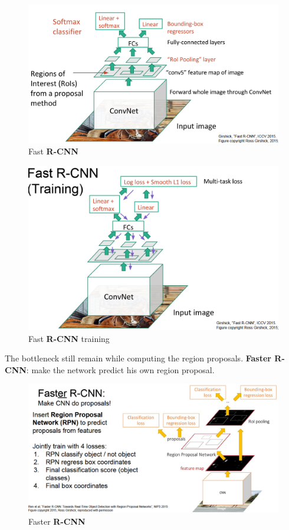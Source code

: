 \documentclass[11pt]{article}
\begin{document}
\begin{minipage}{0.5\textwidth}
\begin{figure} [H]
\centering 
\includegraphics[scale=0.5]{L1015.pdf}
\caption{ Fast \textbf{R-CNN}}
\label{fig:L1015}
\end{figure}
\end{minipage}
\begin{minipage}{0.5\textwidth}
\begin{figure} [H]
\centering 
\includegraphics[scale=0.5]{L1016.pdf}
\caption{ Fast \textbf{R-CNN } training}
\label{fig:L1016}
\end{figure}
\end{minipage}
The bottleneck still remain while computing the region proposals.
\textbf{Faster R-CNN}: make the network predict his own region proposal.
\begin{figure}[h]
\centering
\captionsetup{justification=centering}
\includegraphics[width=0.9\linewidth]{L1017.pdf}
\caption{ Faster \textbf{R-CNN } }
\label{fig:L1017}
\end{figure}
\clearpage
\end{document}
